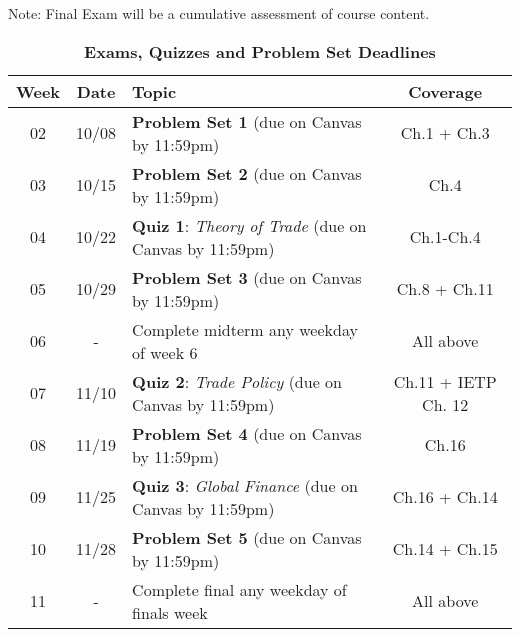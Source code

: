 \documentclass[10pt]{article}
\newcommand{\ra}[1]{\renewcommand{\arraystretch}{#1}}
\begin{document}
Note: Final Exam will be a cumulative assessment of course content. 

\newpage

\begin{table}[h!]
	\caption*{\large\textbf{Exams, Quizzes and Problem Set Deadlines}}
	\centering
	\ra{1.5}
	\begin{tabular}{@{\extracolsep{0.5cm}} c c l c @{}}
		\toprule
		\textbf{Week} & \textbf{Date} & \textbf{Topic} & \textbf{Coverage}  \\ \toprule 
		02 & 10/08 & \textbf{Problem Set 1} (due on Canvas by 11:59pm) & Ch.1 + Ch.3  \\
		03 & 10/15 & \textbf{Problem Set 2} (due on Canvas by 11:59pm) & Ch.4  \\ 
		04 & 10/22 & \textbf{Quiz 1}: \textit{Theory of Trade} (due on Canvas by 11:59pm) & Ch.1-Ch.4 \\
		05 & 10/29 & \textbf{Problem Set 3} (due on Canvas by 11:59pm) & Ch.8 + Ch.11 \\ 
		06 & - & Complete midterm any weekday of week 6 & All above\\
		07 & 11/10 & \textbf{Quiz 2}: \textit{Trade Policy} (due on Canvas by 11:59pm) & Ch.11 + IETP Ch. 12 \\ 
		08 & 11/19 & \textbf{Problem Set 4} (due on Canvas by 11:59pm) &  Ch.16 \\
		09 & 11/25 & \textbf{Quiz 3}: \textit{Global Finance} (due on Canvas by 11:59pm)&  Ch.16 + Ch.14 \\ 
		10 & 11/28 & \textbf{Problem Set 5} (due on Canvas by 11:59pm)& Ch.14 + Ch.15 \\
		11 & - & Complete final any weekday of finals week & All above \\  \bottomrule
	\end{tabular}
\end{table}
\end{document}
